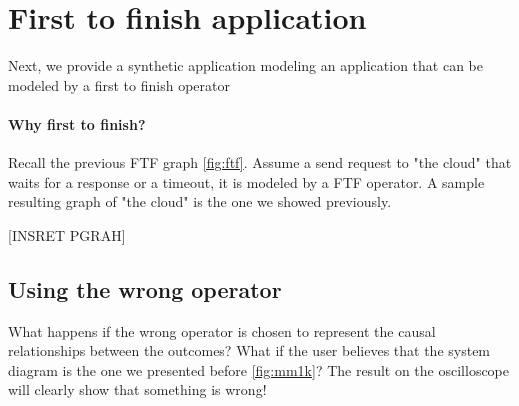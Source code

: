 \section{First to finish application}
    Next, we provide a synthetic application modeling an application that can be modeled by a first to finish operator

    \paragraph{Why first to finish?} Recall the previous FTF graph \cref{fig:ftf}. Assume a send request to "the cloud" that waits for a response or a timeout, it is modeled by a FTF operator. A sample resulting graph of "the cloud" is the one we showed previously.
   
   [INSRET PGRAH]
   \subsection{Using the wrong operator}
        What happens if the wrong operator is chosen to represent the causal relationships between the outcomes? What if the user believes that the system diagram is the one we presented before \cref{fig:mm1k}? The result on the oscilloscope will clearly show that something is wrong! 
